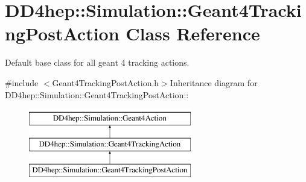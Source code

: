 \hypertarget{class_d_d4hep_1_1_simulation_1_1_geant4_tracking_post_action}{
\section{DD4hep::Simulation::Geant4TrackingPostAction Class Reference}
\label{class_d_d4hep_1_1_simulation_1_1_geant4_tracking_post_action}
}


Default base class for all geant 4 tracking actions.  


{\ttfamily \#include $<$Geant4TrackingPostAction.h$>$}Inheritance diagram for DD4hep::Simulation::Geant4TrackingPostAction::\begin{figure}[H]
\begin{center}
\leavevmode
\includegraphics[height=3cm]{class_d_d4hep_1_1_simulation_1_1_geant4_tracking_post_action}
\end{center}
\end{figure}
